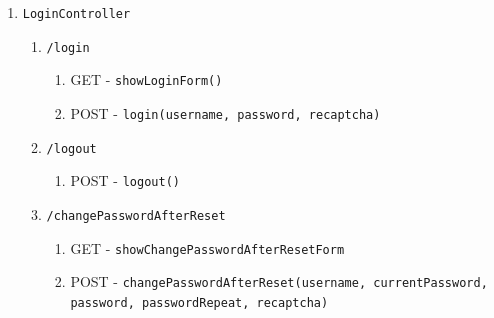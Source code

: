\documentclass[12pt,DIV14,BCOR10mm,a4paper,twoside,parskip=half-,headsepline,headinclude,english,ngerman,bibliography=totocnumbered]{scrreprt}
\begin{document}
\begin{enumerate}
\begin{enumerate}
    \item \texttt{LoginController}
    \begin{enumerate}
      \item \texttt{/login}
      \begin{enumerate}
        \item GET - \texttt{showLoginForm()}
        \item POST - \texttt{login(username, password, recaptcha)}
      \end{enumerate}
      \item \texttt{/logout}
      \begin{enumerate}
        \item POST - \texttt{logout()}
      \end{enumerate}
      \item \texttt{/changePasswordAfterReset}
      \begin{enumerate}
        \item GET - \texttt{showChangePasswordAfterResetForm}
        \item POST - \texttt{changePasswordAfterReset(username, currentPassword, password, passwordRepeat, recaptcha)}
      \end{enumerate}
    \end{enumerate}


\end{enumerate}
\end{enumerate}
\end{document}
